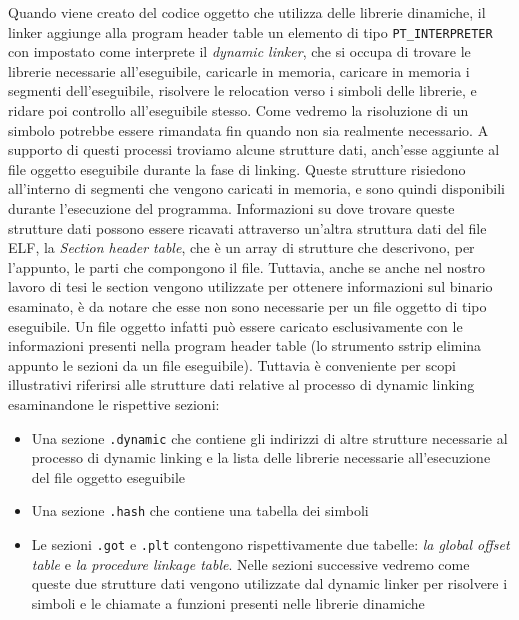 Quando viene creato del codice oggetto che utilizza delle librerie
dinamiche, il linker aggiunge alla program header table un elemento di
tipo \lstinline{PT_INTERPRETER} con impostato come interprete il
\emph{dynamic linker}, che si occupa di trovare le librerie necessarie
all'eseguibile, caricarle in memoria, caricare in memoria i segmenti
dell'eseguibile, risolvere le relocation verso i simboli delle
librerie, e ridare poi controllo all'eseguibile stesso. Come vedremo
la risoluzione di un simbolo potrebbe essere rimandata fin quando non
sia realmente necessario. A supporto di questi processi troviamo
alcune strutture dati, anch'esse aggiunte al file oggetto eseguibile
durante la fase di linking. Queste strutture risiedono all'interno di
segmenti che vengono caricati in memoria, e sono quindi disponibili
durante l'esecuzione del programma. Informazioni su dove trovare
queste strutture dati possono essere ricavati attraverso un'altra
struttura dati del file ELF, la \emph{Section header table}, che è un
array di strutture che descrivono, per l'appunto, le parti che
compongono il file. Tuttavia, anche se anche nel nostro lavoro di tesi
le section vengono utilizzate per ottenere informazioni sul binario
esaminato, è da notare che esse non sono necessarie per un file
oggetto di tipo eseguibile. Un file oggetto infatti può essere
caricato esclusivamente con le informazioni presenti nella program
header table (lo strumento sstrip\cite{sstrip} elimina appunto le
sezioni da un file eseguibile). Tuttavia è conveniente per scopi
illustrativi riferirsi alle strutture dati relative al processo di
dynamic linking esaminandone le rispettive sezioni:

\begin{itemize}

  \item Una sezione \lstinline{.dynamic} che contiene gli indirizzi di
    altre strutture necessarie al processo di dynamic linking e la
    lista delle librerie necessarie all'esecuzione del file oggetto
    eseguibile

  \item Una sezione \lstinline{.hash} che contiene una tabella dei
    simboli

  \item Le sezioni \lstinline{.got} e \lstinline{.plt} contengono
    rispettivamente due tabelle: \emph{la global offset table} e
    \emph{la procedure linkage table}. Nelle sezioni successive
    vedremo come queste due strutture dati vengono utilizzate dal
    dynamic linker per risolvere i simboli e le chiamate a funzioni
    presenti nelle librerie dinamiche

\end{itemize}

